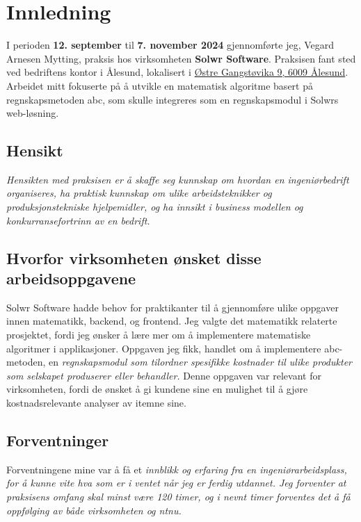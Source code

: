 \section{Innledning}

I perioden \textbf{12. september} til \textbf{7. november 2024} gjennomførte jeg, Vegard Arnesen Mytting, praksis hos virksomheten \textbf{Solwr Software}. Praksisen fant sted ved bedriftens kontor i Ålesund, lokalisert i \href{https://www.google.com/maps/place/Solwr/@62.4774157,6.229681,17z/data=!3m1!4b1!4m6!3m5!1s0x4616da44c5c0db81:0xa0844570521977a4!8m2!3d62.4774157!4d6.229681!16s%2Fg%2F11cn6pj_2s?entry=ttu&g_ep=EgoyMDI0MTEwNS4wIKXMDSoASAFQAw%3D%3D}{Østre Gangstøvika 9, 6009 Ålesund}. Arbeidet mitt fokuserte på å utvikle en matematisk algoritme basert på regnskapsmetoden \gls{abc}, som skulle integreres som en regnskapsmodul i Solwrs web-løsning. \\

\subsection{Hensikt}
\textit{Hensikten med praksisen er å skaffe seg kunnskap om hvordan en ingeniørbedrift organiseres, ha praktisk kunnskap om ulike arbeidsteknikker og produksjonstekniske hjelpemidler, og ha innsikt i business modellen og konkurransefortrinn av en bedrift.} \cite{idata2505}\\

\subsection{Hvorfor virksomheten ønsket disse arbeidsoppgavene}
Solwr Software hadde behov for praktikanter til å gjennomføre ulike oppgaver innen matematikk, backend, og frontend. Jeg valgte det matematikk relaterte prosjektet, fordi jeg ønsker å lære mer om å implementere matematiske algoritmer i applikasjoner. Oppgaven jeg fikk, handlet om å implementere \gls{abc}-metoden, en \textit{regnskapsmodul som tilordner spesifikke kostnader til ulike produkter som selskapet produserer eller behandler.} \cite{agicap_abc} 
Denne oppgaven var relevant for virksomheten, fordi de ønsket å gi kundene sine en mulighet til å gjøre kostnadsrelevante analyser av \gls{item}ne sine. \\

\subsection{Forventninger}
Forventningene mine var å få et \textit{innblikk og erfaring fra en ingeniørarbeidsplass, for å kunne vite hva som er i ventet når jeg er ferdig utdannet. Jeg forventer at praksisens omfang skal minst være 120 timer, og i nevnt timer forventes det å få oppfølging av både virksomheten og \gls{ntnu}.} \cite{idata2505} \\

